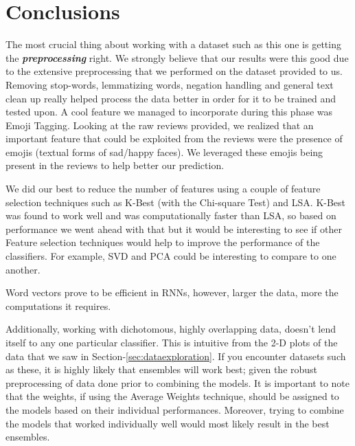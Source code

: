 \section{Conclusions}

The most crucial thing about working with a dataset such as this one is getting the \textit{\textbf{preprocessing}} right. We strongly believe that our results were this good due to the extensive preprocessing that we performed on the dataset provided to us. Removing stop-words, lemmatizing words, negation handling and general text clean up really helped process the data better in order for it to be trained and tested upon. A cool feature we managed to incorporate during this phase was Emoji Tagging. Looking at the raw reviews provided, we realized that an important feature that could be exploited from the reviews were the presence of emojis (textual forms of sad/happy faces). We leveraged these emojis being present in the reviews to help better our prediction.

We did our best to reduce the number of features using a couple of feature selection techniques such as K-Best (with the Chi-square Test) and LSA. K-Best was found to work well and was computationally faster than LSA, so based on performance we went ahead with that but it would be interesting to see if other Feature selection techniques would help to improve the performance of the classifiers. For example, SVD and PCA could be interesting to compare to one another.

Word vectors prove to be efficient in RNNs, however, larger the data,  more the computations it requires.

Additionally, working with dichotomous, highly overlapping data, doesn't lend itself to any one particular classifier. This is intuitive from the 2-D plots of the data that we saw in Section-\ref{sec:dataexploration}. If you encounter datasets such as these, it is highly likely that ensembles will work best; given the robust preprocessing of data done prior to combining the models. It is important to note that the weights, if using the Average Weights technique, should be assigned to the models based on their individual performances. Moreover, trying to combine the models that worked individually well would most likely result in the best ensembles.
